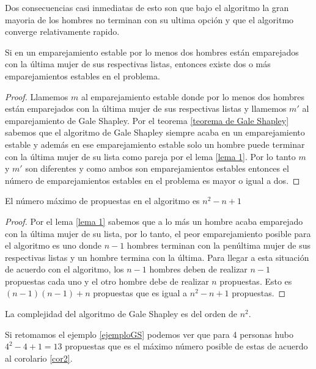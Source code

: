 Dos consecuencias casi inmediatas de esto son que bajo el algoritmo la gran mayoria de los hombres no terminan con su ultima opción y que el algoritmo converge relativamente rapido. 
\begin{cor}
\label{cor1}
Si en un emparejamiento estable por lo menos dos hombres están emparejados con la última mujer de sus respectivas listas, entonces existe dos o más emparejamientos estables en el problema.
\end{cor}

\begin{proof}
Llamemos $m$ al emparejamiento estable donde por lo menos dos hombres están emparejados con la última mujer de sus respectivas listas y llamemos $m'$ al emparejamiento de Gale Shapley.
Por el teorema \ref{teorema de Gale Shapley} sabemos que el algoritmo de Gale Shapley siempre acaba en un emparejamiento estable y además en ese emparejamiento estable solo un hombre puede terminar con la última mujer de su lista como pareja por el lema \ref{lema 1}.
Por lo tanto $m$ y $m'$ son diferentes y como ambos son emparejamientos estables entonces el número de emparejamientos estables en el problema es mayor o igual a dos. 
\end{proof}

\begin{cor}
\label{cor2}
El número máximo de propuestas en el algoritmo es $n^2-n+1$
\end{cor}

\begin{proof}
Por el lema \ref{lema 1} sabemos que a lo más un hombre acaba emparejado con la última mujer de su lista, por lo tanto, el peor emparejamiento posible para el algoritmo es uno donde $n-1$ hombres terminan con la penúltima mujer de sus respectivas listas y un hombre termina con la última. Para llegar a esta situación de acuerdo con el algoritmo, los $n-1$ hombres deben de realizar $n-1$ propuestas cada uno y el otro hombre debe de realizar $n$ propuestas. Esto es $(n-1)(n-1)+n$ propuestas que es igual a $n^2-n+1$ propuestas.
\end{proof}

\begin{obs}
La complejidad del algoritmo de Gale Shapley es del orden de $n^2$.
\end{obs}

\begin{eje}
Si retomamos el ejemplo \ref{ejemploGS} podemos ver que para 4 personas hubo $4^{2}-4+1=13$ propuestas que es el máximo número posible de estas de acuerdo al corolario \ref{cor2}.
\fin
\end{eje}


